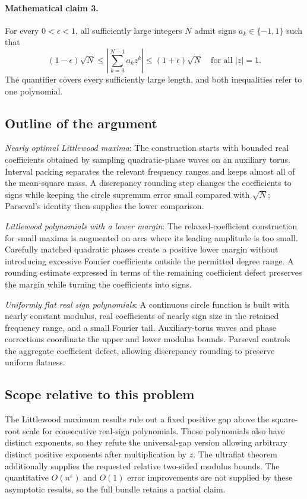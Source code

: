 \documentclass[11pt]{article}
\begin{document}
\paragraph{Mathematical claim 3.} For every $0<\epsilon<1$, all sufficiently large integers $N$ admit signs $a_k\in\{-1,1\}$ such that \[(1-\epsilon)\sqrt N\le\left|\sum_{k=0}^{N-1}a_kz^k\right|\le(1+\epsilon)\sqrt N\quad\text{for all }|z|=1.\] The quantifier covers every sufficiently large length, and both inequalities refer to one polynomial.

\subsection{Outline of the argument}
\textit{Nearly optimal Littlewood maxima}: The construction starts with bounded real coefficients obtained by sampling quadratic-phase waves on an auxiliary torus. Interval packing separates the relevant frequency ranges and keeps almost all of the mean-square mass. A discrepancy rounding step changes the coefficients to signs while keeping the circle supremum error small compared with $\sqrt N$; Parseval’s identity then supplies the lower comparison.

\textit{Littlewood polynomials with a lower margin}: The relaxed-coefficient construction for small maxima is augmented on arcs where its leading amplitude is too small. Carefully matched quadratic phases create a positive lower margin without introducing excessive Fourier coefficients outside the permitted degree range. A rounding estimate expressed in terms of the remaining coefficient defect preserves the margin while turning the coefficients into signs.

\textit{Uniformly flat real sign polynomials}: A continuous circle function is built with nearly constant modulus, real coefficients of nearly sign size in the retained frequency range, and a small Fourier tail. Auxiliary-torus waves and phase corrections coordinate the upper and lower modulus bounds. Parseval controls the aggregate coefficient defect, allowing discrepancy rounding to preserve uniform flatness.

\subsection{Scope relative to this problem}
The Littlewood maximum results rule out a fixed positive gap above the square-root scale for consecutive real-sign polynomials. Those polynomials also have distinct exponents, so they refute the universal-gap version allowing arbitrary distinct positive exponents after multiplication by $z$. The ultraflat theorem additionally supplies the requested relative two-sided modulus bounds. The quantitative $O(n^{\varepsilon})$ and $O(1)$ error improvements are not supplied by these asymptotic results, so the full bundle retains a partial claim.
\end{document}
